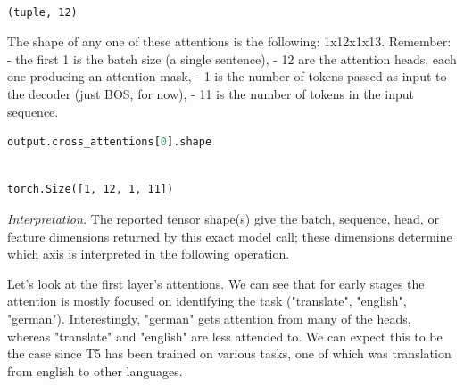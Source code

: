 \documentclass[../labs.tex]{subfiles}
\begin{document}
\hypertarget{res:lab02-text-01-t5-ipynb-94-504242aae736}{}

\begin{lstlisting}[basicstyle=\ttfamily\scriptsize,breaklines=true,breakatwhitespace=false,columns=fullflexible,keepspaces=true]

(tuple, 12)

\end{lstlisting}



\noindent The shape of any one of these attentions is the following: 1x12x1x13. Remember: - the first 1 is the batch size (a single sentence), - 12 are the attention heads, each one producing an attention mask, - 1 is the number of tokens passed as input to the decoder (just BOS, for now), - 11 is the number of tokens in the input sequence.

\begin{lstlisting}[language=Python,basicstyle=\ttfamily\scriptsize,breaklines=true,breakatwhitespace=false,columns=fullflexible,keepspaces=true,numbers=none]
output.cross_attentions[0].shape
\end{lstlisting}

\hypertarget{res:lab02-text-01-t5-ipynb-96-f6327c030100}{}

\begin{lstlisting}[basicstyle=\ttfamily\scriptsize,breaklines=true,breakatwhitespace=false,columns=fullflexible,keepspaces=true]

torch.Size([1, 12, 1, 11])

\end{lstlisting}

\noindent\emph{Interpretation.} The reported tensor shape(s) give the batch, sequence, head, or feature dimensions returned by this exact model call; these dimensions determine which axis is interpreted in the following operation.



\noindent Let's look at the first layer's attentions. We can see that for early stages the attention is mostly focused on identifying the task ("translate", "english", "german"). Interestingly, "german" gets attention from many of the heads, whereas "translate" and "english" are less attended to. We can expect this to be the case since T5 has been trained on various tasks, one of which was translation from english to other languages.
\end{document}
